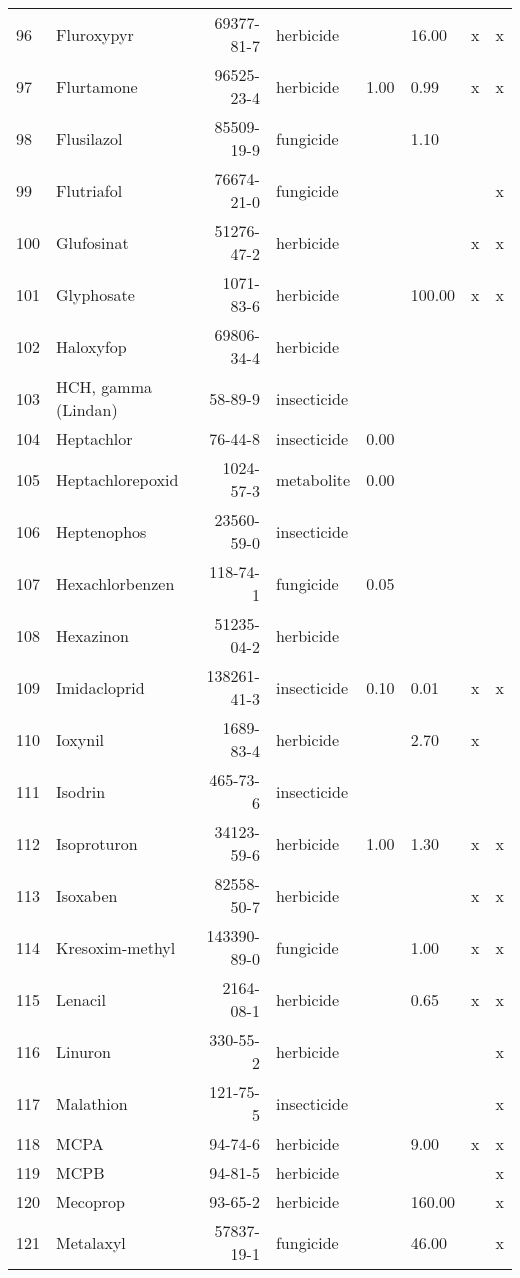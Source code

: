 \begin{longtable}{lp{4cm}rlp{1cm}p{1.5cm}p{1.5cm}p{1cm}}
  96 & Fluroxypyr & 69377-81-7 & herbicide &  & 16.00 & x & x \\ 
  97 & Flurtamone & 96525-23-4 & herbicide & 1.00 & 0.99 & x & x \\ 
  98 & Flusilazol & 85509-19-9 & fungicide &  & 1.10 &  &  \\ 
  99 & Flutriafol & 76674-21-0 & fungicide &  &  &  & x \\ 
  100 & Glufosinat & 51276-47-2 & herbicide &  &  & x & x \\ 
  101 & Glyphosate & 1071-83-6 & herbicide &  & 100.00 & x & x \\ 
  102 & Haloxyfop & 69806-34-4 & herbicide &  &  &  &  \\ 
  103 & HCH, gamma (Lindan) & 58-89-9 & insecticide &  &  &  &  \\ 
  104 & Heptachlor & 76-44-8 & insecticide & 0.00 &  &  &  \\ 
  105 & Heptachlorepoxid & 1024-57-3 & metabolite & 0.00 &  &  &  \\ 
  106 & Heptenophos & 23560-59-0 & insecticide &  &  &  &  \\ 
  107 & Hexachlorbenzen & 118-74-1 & fungicide & 0.05 &  &  &  \\ 
  108 & Hexazinon & 51235-04-2 & herbicide &  &  &  &  \\ 
  109 & Imidacloprid & 138261-41-3 & insecticide & 0.10 & 0.01 & x & x \\ 
  110 & Ioxynil & 1689-83-4 & herbicide &  & 2.70 & x &  \\ 
  111 & Isodrin & 465-73-6 & insecticide &  &  &  &  \\ 
  112 & Isoproturon & 34123-59-6 & herbicide & 1.00 & 1.30 & x & x \\ 
  113 & Isoxaben & 82558-50-7 & herbicide &  &  & x & x \\ 
  114 & Kresoxim-methyl & 143390-89-0 & fungicide &  & 1.00 & x & x \\ 
  115 & Lenacil & 2164-08-1 & herbicide &  & 0.65 & x & x \\ 
  116 & Linuron & 330-55-2 & herbicide &  &  &  & x \\ 
  117 & Malathion & 121-75-5 & insecticide &  &  &  & x \\ 
  118 & MCPA & 94-74-6 & herbicide &  & 9.00 & x & x \\ 
  119 & MCPB & 94-81-5 & herbicide &  &  &  & x \\ 
  120 & Mecoprop & 93-65-2 & herbicide &  & 160.00 &  & x \\ 
  121 & Metalaxyl & 57837-19-1 & fungicide &  & 46.00 &  & x \\ 

\end{longtable}

